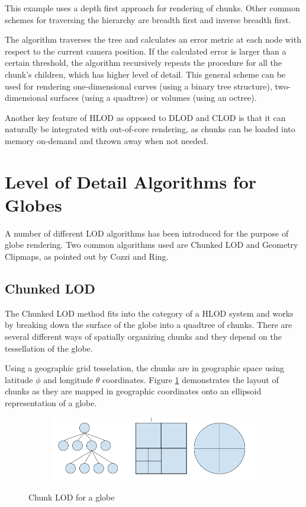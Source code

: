 This example uses a depth first approach for rendering of chunks. Other common schemes for traversing the hierarchy are breadth first and inverse breadth first.

The algorithm traverses the tree and calculates an error metric at each node with respect to the current camera position. If the calculated error is larger than a certain threshold, the algorithm recursively repeats the procedure for all the chunk's children, which has higher level of detail. This general scheme can be used for rendering one-dimensional curves (using a binary tree structure), two-dimensional surfaces (using a quadtree) or volumes (using an octree).

Another key feature of HLOD as opposed to DLOD and CLOD is that it can naturally be integrated with out-of-core rendering, as chunks can be loaded into memory on-demand and thrown away when not needed.



\section{Level of Detail Algorithms for Globes}
A number of different LOD algorithms has been introduced for the purpose of globe rendering. Two common algorithms used are Chunked LOD and Geometry Clipmaps, as pointed out by Cozzi and Ring\cite{cozzi11}.

\subsection{Chunked LOD}
\label{section:chunkedlodbacground}
The Chunked LOD method fits into the category of a HLOD system and works by breaking down the surface of the globe into a quadtree of chunks. There are several different ways of spatially organizing chunks and they depend on the tessellation of the globe. 

Using a geographic grid tesselation, the chunks are in geographic space using latitude $\phi$ and longitude $\theta$ coordinates. Figure \ref{fig:chunkedlod} demonstrates the layout of chunks as they are mapped in geographic coordinates onto an ellipsoid representation of a globe.

\begin{figure}[htbp]
    \centering
    \begin{subfigure}[bt]{0.4\textwidth}
        \includegraphics[width=\textwidth]{figures/chunkedlod/chunkedlodglobe.png}
    \end{subfigure}
    \caption{Chunk LOD for a globe}
    \label{fig:chunkedlod}
\end{figure}

